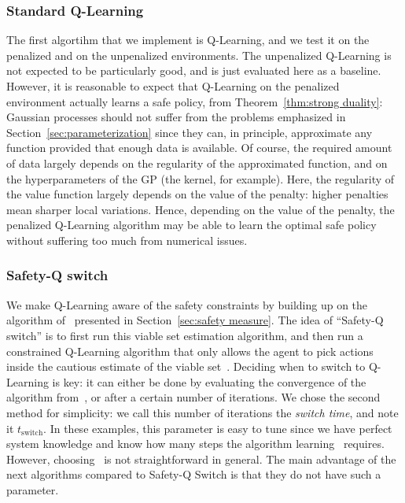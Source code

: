 \subsubsection{Standard Q-Learning}
The first algortihm that we implement is Q-Learning, and we test it on the penalized and on the unpenalized environments. The unpenalized Q-Learning is not expected to be particularly good, and is just evaluated here as a baseline. However, it is reasonable to expect that Q-Learning on the penalized environment actually learns a safe policy, from Theorem~\ref{thm:strong duality}: Gaussian processes should not suffer from the problems emphasized in Section~\ref{sec:parameterization} since they can, in principle, approximate any function provided that enough data is available. Of course, the required amount of data largely depends on the regularity of the approximated function, and on the hyperparameters of the GP (the kernel, for example). Here, the regularity of the value function largely depends on the value of the penalty: higher penalties mean sharper local variations. Hence, depending on the value of the penalty, the penalized Q-Learning algorithm may be able to learn the optimal safe policy without suffering too much from numerical issues.

\subsubsection{Safety-Q switch}
We make Q-Learning aware of the safety constraints by building up on the algorithm of~\textcite{heim2020learnable} presented in Section~\ref{sec:safety measure}. The idea of \enquote{Safety-Q switch} is to first run this viable set estimation algorithm, and then run a constrained Q-Learning algorithm that only allows the agent to pick actions inside the cautious estimate of the viable set~\Qcaut. Deciding when to switch to Q-Learning is key: it can either be done by evaluating the convergence of the algorithm from~\cite{heim2020learnable}, or after a certain number of iterations. We chose the second method for simplicity: we call this number of iterations the \emph{ switch time}, and note it $t_\text{switch}$. In these examples, this parameter is easy to tune since we have perfect system knowledge and know how many steps the algorithm learning \QV~requires. However, choosing \tswitch~is not straightforward in general. The main advantage of the next algorithms compared to Safety-Q Switch is that they do not have such a parameter.

